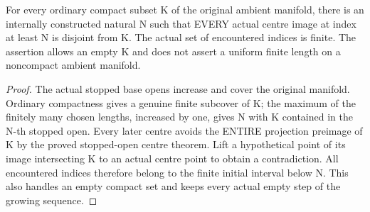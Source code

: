 \begin{theorem}
\label{hir:sharp-actual-curve-growing-history-compact-encounters}
\leanok
For every ordinary compact subset K of the original ambient manifold,
there is an internally constructed natural N such that EVERY actual centre
image at index at least N is disjoint from K. The actual set of encountered
indices is finite. The assertion allows an empty K and does not assert a
uniform finite length on a noncompact ambient manifold.
\end{theorem}
\begin{proof}
The actual stopped base opens increase and cover the original manifold.
Ordinary compactness gives a genuine finite subcover of K; the maximum
of the finitely many chosen lengths, increased by one, gives N with K
contained in the N-th stopped open. Every later centre avoids the ENTIRE
projection preimage of K by the proved stopped-open centre theorem. Lift
a hypothetical point of its image intersecting K to an actual centre point
to obtain a contradiction. All encountered indices therefore belong to
the finite initial interval below N. This also handles an empty compact
set and keeps every actual empty step of the growing sequence.
\end{proof}
